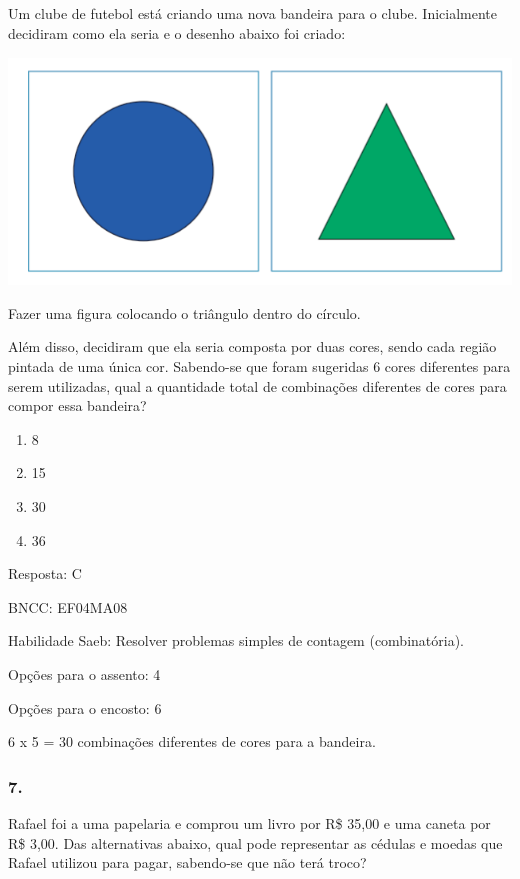 Um clube de futebol está criando uma nova bandeira para o clube.
Inicialmente decidiram como ela seria e o desenho abaixo foi criado:

\includegraphics[width=5.26712in,height=2.37521in]{media/image167.png}

Fazer uma figura colocando o triângulo dentro do círculo.

Além disso, decidiram que ela seria composta por duas cores, sendo cada
região pintada de uma única cor. Sabendo-se que foram sugeridas 6 cores
diferentes para serem utilizadas, qual a quantidade total de combinações
diferentes de cores para compor essa bandeira?

\begin{enumerate}
\def\labelenumi{\alph{enumi})}
\item
  8
\item
  15
\item
  30
\item
  36
\end{enumerate}

Resposta: C

BNCC: EF04MA08

Habilidade Saeb: Resolver problemas simples de contagem (combinatória).

Opções para o assento: 4

Opções para o encosto: 6

6 x 5 = 30 combinações diferentes de cores para a bandeira.

\subsubsection{7.}\label{section-193}

Rafael foi a uma papelaria e comprou um livro por R\$ 35,00 e uma caneta
por R\$ 3,00. Das alternativas abaixo, qual pode representar as cédulas
e moedas que Rafael utilizou para pagar, sabendo-se que não terá troco?

